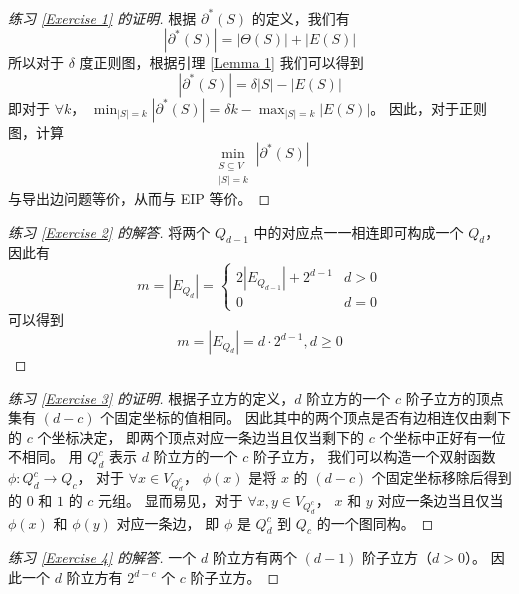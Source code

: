 \documentclass[12pt, a4paper]{article}
\newenvironment{answer}[1][Answer]{
	\begin{proof}[#1]
	\let\qed\relax
}{
	\end{proof}
}
\begin{document}
\begin{proof}[练习 \ref{Exercise 1} 的证明]
根据 $\partial^\ast(S)$ 的定义，我们有
\begin{equation*}
|\partial^\ast(S)| = |\Theta(S)| + |E(S)|
\end{equation*}
所以对于 $\delta$ 度正则图，根据引理 \ref{Lemma 1} 我们可以得到
\begin{equation*}
|\partial^\ast(S)| = \delta |S| - |E(S)|
\end{equation*}
即对于 $\forall k$，
$\min_{|S| = k} |\partial^\ast(S)| = \delta k - \max_{|S| = k} |E(S)|$。
因此，对于正则图，计算
\begin{equation*}
\min_{\substack{
	S \subseteq V \\
	|S| = k
}}|\partial^\ast(S)|
\end{equation*}
与导出边问题等价，从而与 EIP 等价。
\end{proof}

\begin{answer}[练习 \ref{Exercise 2} 的解答]
将两个 $Q_{d - 1}$ 中的对应点一一相连即可构成一个 $Q_d$，因此有
\begin{equation*}
m = |E_{Q_d}| = \begin{cases}
	2 \left|E_{Q_{d - 1}}\right| + 2^{d - 1} & d > 0 \\
	0                                        & d = 0
\end{cases}
\end{equation*}
可以得到
\begin{equation*}
m = |E_{Q_d}| = d \cdot 2^{d - 1}, d \ge 0
\end{equation*}
\end{answer}

\begin{proof}[练习 \ref{Exercise 3} 的证明]
根据子立方的定义，$d$ 阶立方的一个 $c$ 阶子立方的顶点集有 $(d - c)$ 个固定坐标的值相同。
因此其中的两个顶点是否有边相连仅由剩下的 $c$ 个坐标决定，
即两个顶点对应一条边当且仅当剩下的 $c$ 个坐标中正好有一位不相同。
用 $Q_d^c$ 表示 $d$ 阶立方的一个 $c$ 阶子立方，
我们可以构造一个双射函数 $\phi \colon Q_d^c \rightarrow Q_c$，
对于 $\forall x \in V_{Q_d^c}$，
$\phi(x)$ 是将 $x$ 的 $(d - c)$ 个固定坐标移除后得到的 $0$ 和 $1$ 的 $c$ 元组。
显而易见，对于 $\forall x, y \in V_{Q_d^c}$，
$x$ 和 $y$ 对应一条边当且仅当 $\phi(x)$ 和 $\phi(y)$ 对应一条边，
即 $\phi$ 是 $Q_d^c$ 到 $Q_c$ 的一个图同构。
\end{proof}

\begin{answer}[练习 \ref{Exercise 4} 的解答]
一个 $d$ 阶立方有两个 $(d - 1)$ 阶子立方（$d > 0$）。
因此一个 $d$ 阶立方有 $2^{d - c}$ 个 $c$ 阶子立方。
\end{answer}
\end{document}
